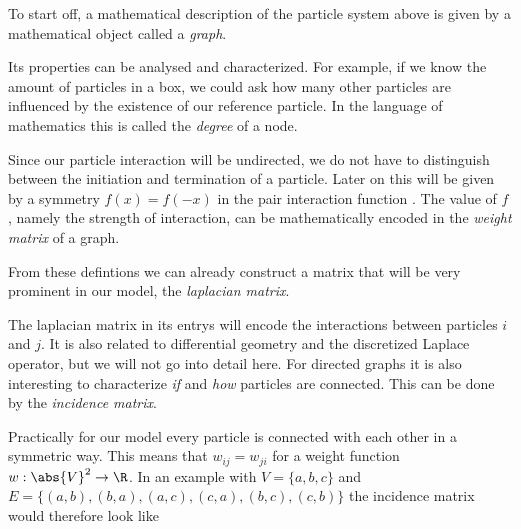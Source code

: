 To start off, a mathematical description of the particle system above is given by a mathematical object called a \emph{graph}.

Its properties can be analysed and characterized. For example, if we know the amount of particles in a box, we could ask how many other particles are influenced by the existence of our reference particle. In the language of mathematics this is called the \emph{degree} of a node.

Since our particle interaction will be undirected, we do not have to distinguish between the initiation and termination of a particle. Later on this will be given by a symmetry $f(x) = f(-x)$ in the pair interaction function \cite{paper:Grigera_2011,mth:vogel}. The value of $f$, namely the strength of interaction, can be mathematically encoded in the \emph{weight matrix} of a graph.

From these defintions we can already construct a matrix that will be very prominent in our model, the \emph{laplacian matrix}.

The laplacian matrix in its entrys will encode the interactions between particles $i$ and $j$. It is also related to differential geometry and the discretized Laplace operator, but we will not go into detail here. For directed graphs it is also interesting to characterize \emph{if} and \emph{how} particles are connected. This can be done by the \emph{incidence matrix}.

Practically for our model every particle is connected with each other in a symmetric way. This means that $w_{ij} = w_{ji}$ for a weight function $w:\abs{V}^2\to \R$.
In an example with $V=\{a,b,c\}$ and $E=\{(a,b),(b,a),(a,c),(c,a),(b,c),(c,b)\}$ the incidence matrix would therefore look like
